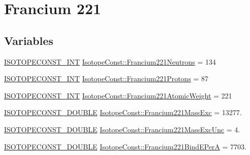 \hypertarget{group___isotope_const-_francium-_fr221}{}\section{Francium 221}
\label{group___isotope_const-_francium-_fr221}
\subsection*{Variables}
\begin{DoxyCompactItemize}
\item 
\mbox{\hyperlink{group___isotope_const-_macros_ga5f18360b3e99483a35c32d789e62621c}{I\+S\+O\+T\+O\+P\+E\+C\+O\+N\+S\+T\+\_\+\+I\+NT}} \mbox{\hyperlink{group___isotope_const-_francium-_fr221_ga4bfdf48f7df1bcd8247afb17a6a1fed4}{Isotope\+Const\+::\+Francium221\+Neutrons}} = 134
\item 
\mbox{\hyperlink{group___isotope_const-_macros_ga5f18360b3e99483a35c32d789e62621c}{I\+S\+O\+T\+O\+P\+E\+C\+O\+N\+S\+T\+\_\+\+I\+NT}} \mbox{\hyperlink{group___isotope_const-_francium-_fr221_ga55adfe61f528ec40c936ec3f7d341f81}{Isotope\+Const\+::\+Francium221\+Protons}} = 87
\item 
\mbox{\hyperlink{group___isotope_const-_macros_ga5f18360b3e99483a35c32d789e62621c}{I\+S\+O\+T\+O\+P\+E\+C\+O\+N\+S\+T\+\_\+\+I\+NT}} \mbox{\hyperlink{group___isotope_const-_francium-_fr221_gad598235d5a069f57987bef56da3a1cbf}{Isotope\+Const\+::\+Francium221\+Atomic\+Weight}} = 221
\item 
\mbox{\hyperlink{group___isotope_const-_macros_ga8f45a7272ce02c0b4c65c44636ed719a}{I\+S\+O\+T\+O\+P\+E\+C\+O\+N\+S\+T\+\_\+\+D\+O\+U\+B\+LE}} \mbox{\hyperlink{group___isotope_const-_francium-_fr221_ga5571fe2c3f8d8a64c99244832698c54f}{Isotope\+Const\+::\+Francium221\+Mass\+Exc}} = 13277.
\item 
\mbox{\hyperlink{group___isotope_const-_macros_ga8f45a7272ce02c0b4c65c44636ed719a}{I\+S\+O\+T\+O\+P\+E\+C\+O\+N\+S\+T\+\_\+\+D\+O\+U\+B\+LE}} \mbox{\hyperlink{group___isotope_const-_francium-_fr221_gac17588eb4cd47058fd496757872d93c8}{Isotope\+Const\+::\+Francium221\+Mass\+Exc\+Unc}} = 4.
\item 
\mbox{\hyperlink{group___isotope_const-_macros_ga8f45a7272ce02c0b4c65c44636ed719a}{I\+S\+O\+T\+O\+P\+E\+C\+O\+N\+S\+T\+\_\+\+D\+O\+U\+B\+LE}} \mbox{\hyperlink{group___isotope_const-_francium-_fr221_ga16b33345dc3493223e87ed7e5f603784}{Isotope\+Const\+::\+Francium221\+Bind\+E\+PerA}} = 7703.
\item 

\end{DoxyCompactItemize}
